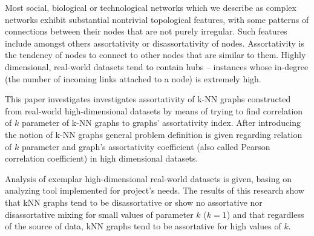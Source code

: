Most social, biological or technological networks which we describe as complex networks exhibit substantial nontrivial topological features, with some patterns of connections between their nodes that are not purely irregular.
Such features include amongst others assortativity or disassortativity of nodes.
Assortativity is the tendency of nodes to connect to other nodes that are similar to them.
Highly dimensional, real-world datasets tend to contain hubs – instances whose in-degree (the number of incoming links attached to a node) is extremely high.

This paper investigates investigates assortativity of k-NN graphs constructed from real-world high-dimensional datasets by means of trying to find correlation of $k$ parameter of k-NN graphs to graphs' assortativity index.
After introducing the notion of k-NN graphs general problem definition is given regarding relation of $k$ parameter and graph's assortativity coefficient (also called Pearson correlation coefficient) in high dimensional datasets.

Analysis of exemplar high-dimensional real-world datasets is given, basing on analyzing tool implemented for project's needs.
The results of this research show that kNN graphs tend to be disassortative or show no assortative nor disassortative mixing for small values of parameter $k$ ($k = 1$) and that regardless of the source of data, kNN graphs tend to be assortative for high values of $k$.
